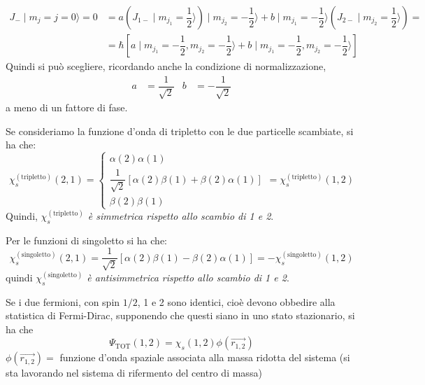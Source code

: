 \begin{equation}
\begin{split}
J_{-} \mid m_{j} = j = 0 \rangle = 0 &= a\left(J_{1-} \mid m_{j_{1}} = \dfrac{1}{2} \rangle \right) \mid m_{j_{2}} = -\dfrac{1}{2}\rangle + b\mid m_{j_{1}} = -\dfrac{1}{2} \rangle \left( J_{2-} \mid m_{j_{2}} = \dfrac{1}{2} \rangle \right) = \\
&= \hbar \left[a \mid m_{j_{1}} = -\dfrac{1}{2}, m_{j_{2}} = -\dfrac{1}{2}\rangle + b\mid m_{j_{1}} = -\dfrac{1}{2}, m_{j_{2}} = -\dfrac{1}{2}\rangle \right] 
\end{split}
\end{equation}
Quindi si può scegliere, ricordando anche la condizione di normalizzazione, 
\begin{align}
a &= \dfrac{1}{\sqrt{2}} & b &= -\dfrac{1}{\sqrt{2}}
\end{align}
a meno di un fattore di fase.

Se consideriamo la funzione d'onda di tripletto con le due particelle scambiate,
si ha che:
\[
\chi _{s} ^{(\text{tripletto})} (2,1) =
\begin{cases}
\alpha(2) \alpha(1) \\
\dfrac{1}{\sqrt{2}} \left[\alpha(2)\beta(1) + \beta(2)\alpha(1)\right] \\
\beta(2)\beta(1) 
\end{cases}
= \chi _{s} ^{(\text{tripletto})} (1,2)
\]
Quindi, \textit{$\chi _{s} ^{(\text{tripletto})}$ è simmetrica rispetto allo
scambio di 1 e 2}.

Per le funzioni di singoletto si ha che:
\begin{equation}
\chi _{s} ^{(\text{singoletto})} (2,1) = \dfrac{1}{\sqrt{2}} \left[ \alpha(2)\beta(1) - \beta(2)\alpha(1) \right] = -\chi _{s} ^{(\text{singoletto})} (1,2)
\end{equation}
quindi \textit{$\chi_{s} ^{(\text{singoletto})}$ è antisimmetrica rispetto allo
scambio di 1 e 2}.

Se i due fermioni, con spin $1/2$, 1 e 2 sono identici, cioè devono obbedire
alla statistica di Fermi-Dirac, supponendo che questi siano in uno stato
stazionario, si ha che
\begin{equation}
\Psi _\text{TOT} (1,2) = \chi _{s} (1,2) \phi (\vec{r_{1,2}})
\end{equation}
$\phi (\vec{r_{1,2}}) =$ funzione d'onda spaziale associata alla massa ridotta
del sistema (si sta lavorando nel sistema di rifermento del centro di massa)

